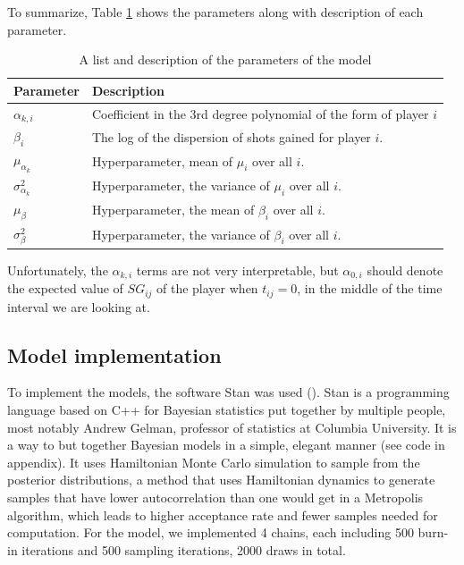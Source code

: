 \documentclass{article}\usepackage[]{graphicx}\usepackage[]{color}
\begin{document}
\medskip\par
To summarize, Table \ref{tab:parameters} shows the parameters along with description of each parameter.
\begin{table}[h]
    \centering
    \caption{A list and description of the parameters of the model}
    \begin{tabular}{ll}
        \toprule
        \textbf{Parameter} & \textbf{Description} \\
        \midrule
        $\alpha_{k,i}$ & Coefficient in the 3rd degree polynomial of the form of player $i$ \\
        $\beta_i$ & The log of the dispersion of shots gained for player $i$. \\
        $\mu_{\alpha_k}$ & Hyperparameter, mean of $\mu_i$ over all $i$. \\
        $\sigma^2_{\alpha_k}$ & Hyperparameter, the variance of $\mu_i$ over all $i$. \\
        $\mu_\beta$ & Hyperparameter, the mean of $\beta_i$ over all $i$. \\
        $\sigma^2_\beta$ & Hyperparameter, the variance of $\beta_i$ over all $i$. \\
        \bottomrule
    \end{tabular}
    \label{tab:parameters}
\end{table}

Unfortunately, the $\alpha_{k,i}$ terms are not very interpretable, but $\alpha_{0,i}$ should denote the expected value of $SG_{ij}$ of the player when $t_{ij}=0$, in the middle of the time interval we are looking at.

\subsection{Model implementation}
To implement the models, the software Stan was used (\citealp{carpenter2017stan}). Stan is a programming language based on C++ for Bayesian statistics put together by multiple people, most notably Andrew Gelman, professor of statistics at Columbia University. It is a way to but together Bayesian models in a simple, elegant manner (see code in appendix). It uses Hamiltonian Monte Carlo simulation to sample from the posterior distributions, a method that uses Hamiltonian dynamics to generate samples that have lower autocorrelation than one would get in a Metropolis algorithm, which leads to higher acceptance rate and fewer samples needed for computation. For the model, we implemented 4 chains, each including 500 burn-in iterations and 500 sampling iterations, 2000 draws in total.
\end{document}
